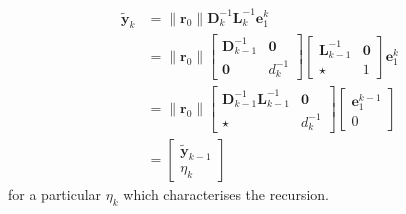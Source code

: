 \documentclass[12pt,a4paper]{article} %
\begin{document}
\begin{align*}
    \bm {\tilde y}_k &= \| \bm r_0 \|\mathbf D_k^{-1} \mathbf L_k^{-1} \bm e_1^k \\ 
     &= \| \bm r_0 \|\begin{bmatrix}
         \mathbf D_{k-1}^{-1} & \bm 0 \\ 
         \bm 0 & d_k^{-1}
     \end{bmatrix}\begin{bmatrix}
        \mathbf L_{k-1}^{-1} & \bm 0 \\ 
        \star & 1
     \end{bmatrix}  \bm e_1^k \\ 
     &= \| \bm r_0 \| \begin{bmatrix}
        \mathbf D_{k-1}^{-1}\mathbf L_{k-1}^{-1}  & \bm 0 \\ 
        \star & d_k^{-1}
     \end{bmatrix} \begin{bmatrix}
         \bm e_1^{k-1} \\ 0
     \end{bmatrix} \\ 
     &= \begin{bmatrix}
         \bm {\tilde y}_{k-1} \\ \eta_k
     \end{bmatrix}
\end{align*}
for a particular $\eta_k$ which characterises the recursion.
\end{document}
